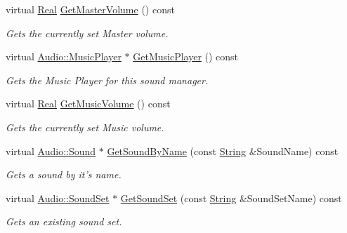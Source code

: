 \begin{DoxyCompactItemize}
virtual \hyperlink{namespaceMezzanine_a726731b1a7df72bf3583e4a97282c6f6}{Real} \hyperlink{classMezzanine_1_1AudioManager_a8ff9ae76e2aa05b3f49346b2dd5542e0}{GetMasterVolume} () const 
\begin{DoxyCompactList}\small\item\em Gets the currently set Master volume. \item\end{DoxyCompactList}\item 
virtual \hyperlink{classMezzanine_1_1Audio_1_1MusicPlayer}{Audio::MusicPlayer} $\ast$ \hyperlink{classMezzanine_1_1AudioManager_a083c78deb0a783850c0f5a036cafb1b3}{GetMusicPlayer} () const 
\begin{DoxyCompactList}\small\item\em Gets the Music Player for this sound manager. \item\end{DoxyCompactList}\item 
virtual \hyperlink{namespaceMezzanine_a726731b1a7df72bf3583e4a97282c6f6}{Real} \hyperlink{classMezzanine_1_1AudioManager_a0cfcb626b2023911aaa7dee25f49a596}{GetMusicVolume} () const 
\begin{DoxyCompactList}\small\item\em Gets the currently set Music volume. \item\end{DoxyCompactList}\item 
virtual \hyperlink{classMezzanine_1_1Audio_1_1Sound}{Audio::Sound} $\ast$ \hyperlink{classMezzanine_1_1AudioManager_ab65a0838326b7087488052e1c0868078}{GetSoundByName} (const \hyperlink{namespaceMezzanine_acf9fcc130e6ebf08e3d8491aebcf1c86}{String} \&SoundName) const 
\begin{DoxyCompactList}\small\item\em Gets a sound by it's name. \item\end{DoxyCompactList}\item 
virtual \hyperlink{classMezzanine_1_1Audio_1_1SoundSet}{Audio::SoundSet} $\ast$ \hyperlink{classMezzanine_1_1AudioManager_a30d640929214f4dc721da0fa6374743d}{GetSoundSet} (const \hyperlink{namespaceMezzanine_acf9fcc130e6ebf08e3d8491aebcf1c86}{String} \&SoundSetName) const 
\begin{DoxyCompactList}\small\item\em Gets an existing sound set. \item\end{DoxyCompactList}\item 

\end{DoxyCompactItemize}
